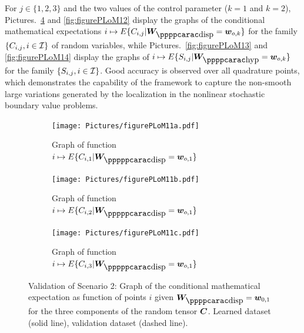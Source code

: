 For $j\in\{1,2,3\}$ and the two values of the control parameter ($k=1$ and $k=2$), Pictures.~\ref{fig:figurePLoM11} and
\ref{fig:figurePLoM12} display the graphs of the conditional mathematical expectations
$i\mapsto E\{ C_{i,j} \vert \bfW_\dispp = \bfw_{o,k} \}$  for the family  $\{C_{i,j},i\in{\mathcal{I}}\}$ of random variables, while Pictures.~\ref{fig:figurePLoM13} and \ref{fig:figurePLoM14} display the graphs of $i\mapsto E\{ S_{i,j} \vert \bfW_\hypp = \bfw_{o,k} \}$  for the family  $\{S_{i,j},i\in{\mathcal{I}}\}$. Good accuracy is observed over all quadrature points, which demonstrates the capability of the framework to capture the non-smooth large variations generated by the localization in the nonlinear stochastic boundary value problems.

\begin{figure}[!htb]
    \centering
    \begin{subfigure}[b]{0.33\textwidth}
    \centering
        \texttt{[image: Pictures/figurePLoM11a.pdf]}
        \caption{Graph of function $i\mapsto E\{ C_{i,1} \vert \bfW_\disppp = \bfw_{o,1} \}$}
        \label{fig:figurePLoM11a}
    \end{subfigure}
    \centering
    \begin{subfigure}[b]{0.33\textwidth}
    \centering
        \texttt{[image: Pictures/figurePLoM11b.pdf]}
        \caption{Graph of function $i\mapsto E\{ C_{i,2} \vert \bfW_\disppp = \bfw_{o,1} \}$}
        \label{fig:figurePLoM11b}
    \end{subfigure}
    \centering
    \begin{subfigure}[b]{0.33\textwidth}
    \centering
        \texttt{[image: Pictures/figurePLoM11c.pdf]}
        \caption{Graph of function $i\mapsto E\{ C_{i,3} \vert \bfW_\disppp = \bfw_{o,1} \}$}
        \label{fig:figurePLoM11c}
    \end{subfigure}
    \caption{Validation of Scenario 2: Graph of the conditional mathematical expectation as function of points $i$ given $\bfW_\dispp =\bfw_{0,1}$ for the three components of the random tensor ${\boldsymbol{C}}$.  Learned dataset (solid line), validation dataset (dashed line).}
    \label{fig:figurePLoM11}
\end{figure}
%
